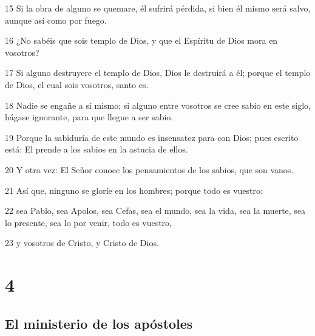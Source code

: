 \par 15 Si la obra de alguno se quemare, él sufrirá pérdida, si bien él mismo será salvo, aunque así como por fuego.
\par 16 ¿No sabéis que sois templo de Dios, y que el Espíritu de Dios mora en vosotros?
\par 17 Si alguno destruyere el templo de Dios, Dios le destruirá a él; porque el templo de Dios, el cual sois vosotros, santo es.
\par 18 Nadie se engañe a sí mismo; si alguno entre vosotros se cree sabio en este siglo, hágase ignorante, para que llegue a ser sabio.
\par 19 Porque la sabiduría de este mundo es insensatez para con Dios; pues escrito está: El prende a los sabios en la astucia de ellos.
\par 20 Y otra vez: El Señor conoce los pensamientos de los sabios, que son vanos.
\par 21 Así que, ninguno se gloríe en los hombres; porque todo es vuestro:
\par 22 sea Pablo, sea Apolos, sea Cefas, sea el mundo, sea la vida, sea la muerte, sea lo presente, sea lo por venir, todo es vuestro,
\par 23 y vosotros de Cristo, y Cristo de Dios.

\chapter{4}

\section*{El ministerio de los apóstoles}

